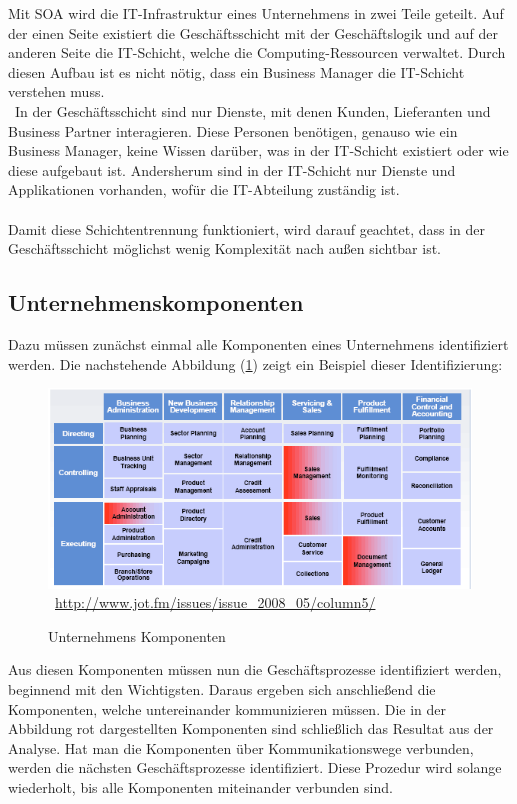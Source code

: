 Mit SOA wird die IT-Infrastruktur eines Unternehmens in zwei Teile geteilt. Auf der einen Seite existiert die Geschäftsschicht mit der Geschäftslogik und auf der anderen Seite die IT-Schicht, welche die Computing-Ressourcen verwaltet. Durch diesen Aufbau ist es nicht nötig, dass ein Business Manager die IT-Schicht verstehen muss.
\\\
In der Geschäftsschicht sind nur Dienste, mit denen Kunden, Lieferanten und Business Partner interagieren. Diese Personen benötigen, genauso wie ein Business Manager, keine Wissen darüber, was in der IT-Schicht existiert oder wie diese aufgebaut ist. Andersherum sind in der IT-Schicht nur Dienste und Applikationen vorhanden, wofür die IT-Abteilung zuständig ist.
\\\\
Damit diese Schichtentrennung funktioniert, wird darauf geachtet, dass in der Geschäftsschicht möglichst wenig Komplexität nach außen sichtbar ist.

\subsection{Unternehmenskomponenten}
\label{subsec:UnternehmensKomponenten}
Dazu müssen zunächst einmal alle Komponenten eines Unternehmens identifiziert werden. Die nachstehende Abbildung (\ref{fig:UnternehmensKomponenten}) zeigt ein Beispiel dieser Identifizierung:

\begin{figure}[htb]
    \centering 
    \includegraphics[width=\linewidth]{content/images/UnternehmensKomponenten}\
    \quelle\url{http://www.jot.fm/issues/issue_2008_05/column5/}
    \caption[Unternehmens Komponenten]{Unternehmens Komponenten\\}
    \label{fig:UnternehmensKomponenten}  
\end{figure} 
\newpage
Aus diesen Komponenten müssen nun die Geschäftsprozesse identifiziert werden, beginnend mit den Wichtigsten. Daraus ergeben sich anschließend die Komponenten, welche untereinander kommunizieren müssen. Die in der Abbildung rot dargestellten Komponenten sind schließlich das Resultat aus der Analyse. Hat man die Komponenten über Kommunikationswege verbunden, werden die nächsten Geschäftsprozesse identifiziert. Diese Prozedur wird solange wiederholt, bis alle Komponenten miteinander verbunden sind.

